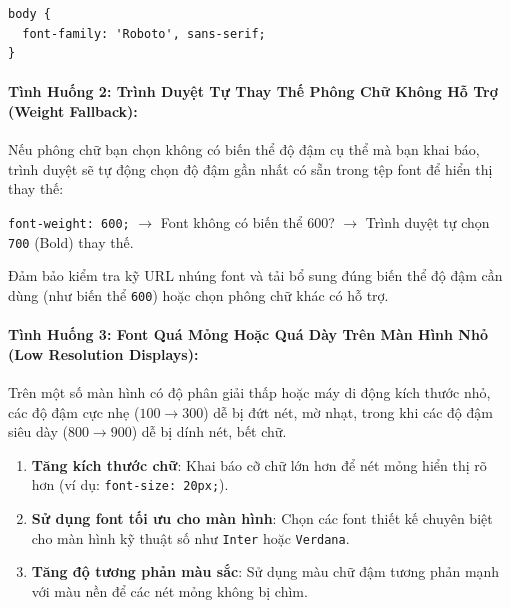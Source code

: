 \documentclass[11pt,oneside]{book}
\newcommand{\codeinline}[1]{\textcolor{accentOrange}{\texttt{#1}}}
\begin{document}
\begin{codeWindow}
\begin{lstlisting}[language=CSS3]
body {
  font-family: 'Roboto', sans-serif;
}
\end{lstlisting}
\end{codeWindow}

\paragraph{Tình Huống 2: Trình Duyệt Tự Thay Thế Phông Chữ Không Hỗ Trợ (Weight Fallback):}

\begin{conceptBox}
Nếu phông chữ bạn chọn không có biến thể độ đậm cụ thể mà bạn khai báo, trình duyệt sẽ tự động chọn độ đậm gần nhất có sẵn trong tệp font để hiển thị thay thế:
\begin{center}
\codeinline{font-weight: 600;} $\rightarrow$ Font không có biến thể 600? $\rightarrow$ Trình duyệt tự chọn \codeinline{700} (Bold) thay thế.
\end{center}
\end{conceptBox}

\begin{tipBox}
Đảm bảo kiểm tra kỹ URL nhúng font và tải bổ sung đúng biến thể độ đậm cần dùng (như biến thể \codeinline{600}) hoặc chọn phông chữ khác có hỗ trợ.
\end{tipBox}

\paragraph{Tình Huống 3: Font Quá Mỏng Hoặc Quá Dày Trên Màn Hình Nhỏ (Low Resolution Displays):}

\begin{warnBox}
Trên một số màn hình có độ phân giải thấp hoặc máy di động kích thước nhỏ, các độ đậm cực nhẹ ($100 \rightarrow 300$) dễ bị đứt nét, mờ nhạt, trong khi các độ đậm siêu dày ($800 \rightarrow 900$) dễ bị dính nét, bết chữ.
\end{warnBox}

\begin{tipBox}
\begin{enumerate}[leftmargin=1.5em, itemsep=3pt, parsep=0pt]
    \item \textbf{Tăng kích thước chữ}: Khai báo cỡ chữ lớn hơn để nét mỏng hiển thị rõ hơn (ví dụ: \codeinline{font-size: 20px;}).
    \item \textbf{Sử dụng font tối ưu cho màn hình}: Chọn các font thiết kế chuyên biệt cho màn hình kỹ thuật số như \codeinline{Inter} hoặc \codeinline{Verdana}.
    \item \textbf{Tăng độ tương phản màu sắc}: Sử dụng màu chữ đậm tương phản mạnh với màu nền để các nét mỏng không bị chìm.
\end{enumerate}
\end{tipBox}
\end{document}
